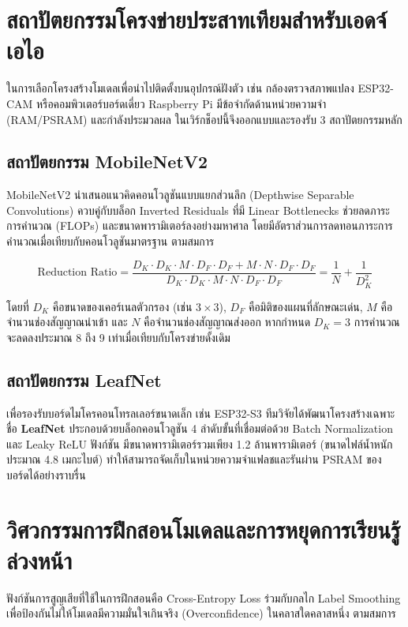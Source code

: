 \section{สถาปัตยกรรมโครงข่ายประสาทเทียมสำหรับเอดจ์เอไอ}

ในการเลือกโครงสร้างโมเดลเพื่อนำไปติดตั้งบนอุปกรณ์ฝังตัว เช่น กล้องตรวจสภาพแปลง ESP32-CAM หรือคอมพิวเตอร์บอร์ดเดี่ยว Raspberry Pi มีข้อจำกัดด้านหน่วยความจำ (RAM/PSRAM) และกำลังประมวลผล ในเวิร์กช็อปนี้จึงออกแบบและรองรับ 3 สถาปัตยกรรมหลัก

\subsection{สถาปัตยกรรม MobileNetV2}
MobileNetV2 นำเสนอแนวคิดคอนโวลูชันแบบแยกส่วนลึก (Depthwise Separable Convolutions) ควบคู่กับบล็อก Inverted Residuals ที่มี Linear Bottlenecks ช่วยลดภาระการคำนวณ (FLOPs) และขนาดพารามิเตอร์ลงอย่างมหาศาล โดยมีอัตราส่วนการลดทอนภาระการคำนวณเมื่อเทียบกับคอนโวลูชันมาตรฐาน ตามสมการ

\begin{equation}
    \text{Reduction Ratio} = \frac{D_K \cdot D_K \cdot M \cdot D_F \cdot D_F + M \cdot N \cdot D_F \cdot D_F}{D_K \cdot D_K \cdot M \cdot N \cdot D_F \cdot D_F} = \frac{1}{N} + \frac{1}{D_K^2}
\end{equation}

\noindent โดยที่ $D_K$ คือขนาดของเคอร์เนลตัวกรอง (เช่น $3 \times 3$), $D_F$ คือมิติของแผนที่ลักษณะเด่น, $M$ คือจำนวนช่องสัญญาณนำเข้า และ $N$ คือจำนวนช่องสัญญาณส่งออก หากกำหนด $D_K = 3$ การคำนวณจะลดลงประมาณ 8 ถึง 9 เท่าเมื่อเทียบกับโครงข่ายดั้งเดิม

\subsection{สถาปัตยกรรม LeafNet}
เพื่อรองรับบอร์ดไมโครคอนโทรลเลอร์ขนาดเล็ก เช่น ESP32-S3 ทีมวิจัยได้พัฒนาโครงสร้างเฉพาะชื่อ \textbf{LeafNet} ประกอบด้วยบล็อกคอนโวลูชัน 4 ลำดับขั้นที่เชื่อมต่อด้วย Batch Normalization และ Leaky ReLU ฟังก์ชัน มีขนาดพารามิเตอร์รวมเพียง 1.2 ล้านพารามิเตอร์ (ขนาดไฟล์น้ำหนักประมาณ 4.8 เมกะไบต์) ทำให้สามารถจัดเก็บในหน่วยความจำแฟลชและรันผ่าน PSRAM ของบอร์ดได้อย่างราบรื่น

\section{วิศวกรรมการฝึกสอนโมเดลและการหยุดการเรียนรู้ล่วงหน้า}

ฟังก์ชันการสูญเสียที่ใช้ในการฝึกสอนคือ Cross-Entropy Loss ร่วมกับกลไก Label Smoothing เพื่อป้องกันไม่ให้โมเดลมีความมั่นใจเกินจริง (Overconfidence) ในคลาสใดคลาสหนึ่ง ตามสมการ

